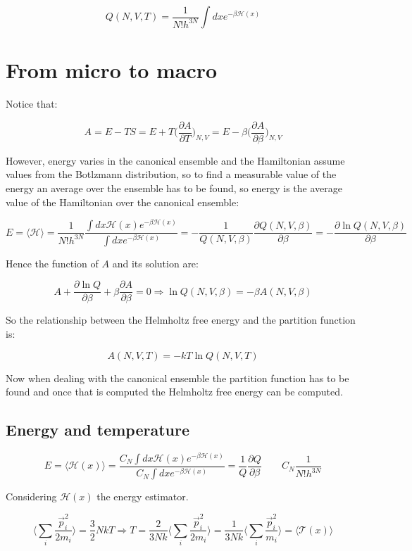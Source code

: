 		$$Q(N, V, T) = \frac{1}{N!h^{3N}}\int dx e^{-\beta\mathcal{H}(x)}$$

\section{From micro to macro}
Notice that:

$$A = E-TS = E+T\biggl(\frac{\partial A}{\partial T}\biggr)_{N, V} = E-\beta\biggl(\frac{\partial A}{\partial \beta}\biggr)_{N, V}$$

However, energy varies in the canonical ensemble and the Hamiltonian assume values from the Botlzmann distribution, so to find a measurable value of the energy an average over the ensemble has to be found, so energy is the average value of the Hamiltonian over the canonical ensemble:

$$E = \langle\mathcal{H}\rangle = \frac{1}{N!h^{3N}}\frac{\int dx\mathcal{H}(x)e^{-\beta\mathcal{H}(x)}}{\int dx e^{-\beta\mathcal{H}(x)}} = -\frac{1}{Q(N, V, \beta)}\frac{\partial Q(N, V, \beta)}{\partial \beta} = -\frac{\partial\ln Q(N, V, \beta)}{\partial \beta}$$

Hence the function of $A$ and its solution are:

$$A + \frac{\partial \ln Q}{\partial \beta} +\beta\frac{\partial A}{\partial \beta} = 0\Rightarrow \ln Q(N, V, \beta)  = -\beta A(N, V, \beta)$$

So the relationship between the Helmholtz free energy and the partition function is:

$$A(N, V, T) = -kT\ln Q(N, V, T)$$

Now when dealing with the canonical ensemble the partition function has to be found and once that is computed the Helmholtz free energy can be computed.

	\subsection{Energy and temperature}

	$$E = \langle\mathcal{H}(x)\rangle = \frac{C_N\int dx\mathcal{H}(x)e^{-\beta\mathcal{H}(x)}}{C_N\int dxe^{-\beta\mathcal{H}(x)}} = \frac{1}{Q}\frac{\partial Q}{\partial \beta}\qquad C_N\frac{1}{N!h^{3N}}$$

	Considering $\mathcal{H}(x)$ the energy estimator.

	$$\biggl\langle\sum\limits_{i}\frac{\vec{p}_i^2}{2m_i}\biggr\rangle = \frac{3}{2}NkT\Rightarrow T = \frac{2}{3Nk}\biggl\langle\sum\limits_i\frac{\vec{p}_i^2}{2m_i}\biggr\rangle = \frac{1}{3Nk}\biggl\langle\sum\limits_i\frac{\vec{p}_i^2}{m_i}\biggr\rangle = \langle\mathcal{T}(x)\rangle$$

